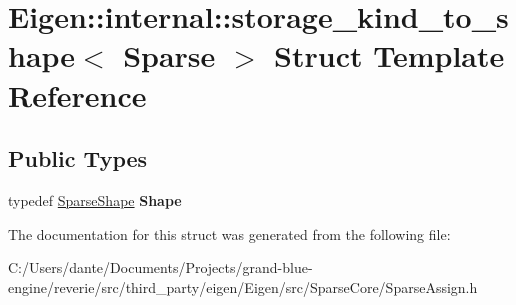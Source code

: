 \hypertarget{struct_eigen_1_1internal_1_1storage__kind__to__shape_3_01_sparse_01_4}{}\section{Eigen\+::internal\+::storage\+\_\+kind\+\_\+to\+\_\+shape$<$ Sparse $>$ Struct Template Reference}
\label{struct_eigen_1_1internal_1_1storage__kind__to__shape_3_01_sparse_01_4}
\subsection*{Public Types}
\begin{DoxyCompactItemize}
\item 
\mbox{\label{struct_eigen_1_1internal_1_1storage__kind__to__shape_3_01_sparse_01_4_a689e0c288d635039f22652abf8de498f}} 
typedef \mbox{\hyperlink{struct_eigen_1_1_sparse_shape}{Sparse\+Shape}} {\bfseries Shape}
\end{DoxyCompactItemize}


The documentation for this struct was generated from the following file\+:\begin{DoxyCompactItemize}
\item 
C\+:/\+Users/dante/\+Documents/\+Projects/grand-\/blue-\/engine/reverie/src/third\+\_\+party/eigen/\+Eigen/src/\+Sparse\+Core/Sparse\+Assign.\+h\end{DoxyCompactItemize}

